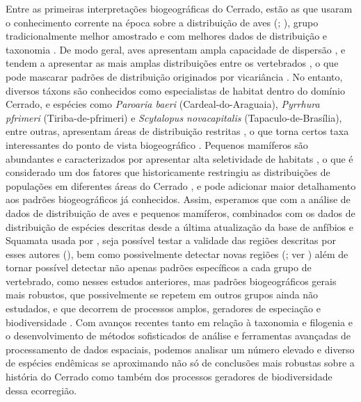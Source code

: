 \documentclass[12pt,openright,oneside,a4paper,english]{abntex2}
\begin{document}
Entre as primeiras interpretações biogeográficas do Cerrado, estão as que usaram o conhecimento corrente na época sobre a distribuição de aves (\citealp{Silva1995, Silva1997}; \citealp[ver, porém][]{Vanzolini1963, Muller1979}), grupo tradicionalmente melhor amostrado e com melhores dados de distribuição e taxonomia \citep{Brown1995}. De modo geral, aves apresentam ampla capacidade de dispersão \citep{Sick1997}, e tendem a apresentar as mais amplas distribuições entre os vertebrados \citep{Gaston1996}, o que pode mascarar padrões de distribuição originados por vicariância \citep{Hausdorf2002}. No entanto, diversos táxons são conhecidos como especialistas de habitat dentro do domínio Cerrado, e espécies como \textit{Paroaria baeri} (Cardeal-do-Araguaia), \textit{Pyrrhura pfrimeri} (Tiriba-de-pfrimeri) e \textit{Scytalopus novacapitalis} (Tapaculo-de-Brasília), entre outras, apresentam áreas de distribuição restritas \citep{Gwynne2010}, o que torna certos taxa interessantes do ponto de vista biogeográfico \citep{Silva1997}. Pequenos mamíferos são abundantes e caracterizados por apresentar alta seletividade de habitats \citep{Carmignotto2011}, o que é considerado um dos fatores que historicamente restringiu as distribuições de populações em diferentes áreas do Cerrado \citep{Carmignotto2022}, e pode adicionar maior detalhamento aos padrões biogeográficos já conhecidos. Assim, esperamos que com a análise de dados de distribuição de aves e pequenos mamíferos, combinados com os dados de distribuição de espécies descritas desde a última atualização da base de anfíbios e Squamata usada por \citet{Azevedo2016}, seja possível testar a validade das regiões descritas por esses autores (\citealp[e.g][]{Silva1997, Nogueira2011, Azevedo2016}), bem como possivelmente detectar novas regiões (\citealp{Carvalho2016}; ver ) além de tornar possível detectar não apenas padrões específicos a cada grupo de vertebrado, como nesses estudos anteriores, mas padrões biogeográficos gerais mais robustos, que possivelmente se repetem em outros grupos ainda não estudados, e que decorrem de processos amplos, geradores de especiação e biodiversidade \citep{Wiley1988, Morrone2002}. Com avanços recentes tanto em relação à taxonomia e filogenia e o desenvolvimento de métodos sofisticados de análise e ferramentas avançadas de processamento de dados espaciais, podemos analisar um número elevado e diverso de espécies endêmicas se aproximando não só de conclusões mais robustas sobre a história do Cerrado como também dos processos geradores de biodiversidade dessa ecorregião.
\end{document}
